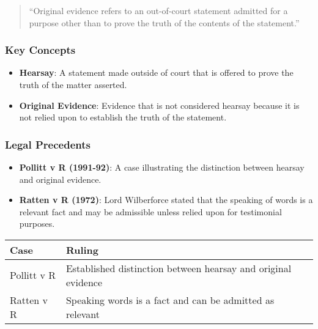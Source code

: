 \begin{quote}
``Original evidence refers to an out-of-court statement admitted for a
purpose other than to prove the truth of the contents of the
statement.''
\end{quote}

\subsubsection{Key Concepts}\label{key-concepts-2}

\begin{itemize}
\tightlist
\item
  \textbf{Hearsay}: A statement made outside of court that is offered to
  prove the truth of the matter asserted.
\item
  \textbf{Original Evidence}: Evidence that is not considered hearsay
  because it is not relied upon to establish the truth of the statement.
\end{itemize}

\subsubsection{Legal Precedents}\label{legal-precedents-1}

\begin{itemize}
\tightlist
\item
  \textbf{Pollitt v R (1991-92)}: A case illustrating the distinction
  between hearsay and original evidence.
\item
  \textbf{Ratten v R (1972)}: Lord Wilberforce stated that the speaking
  of words is a relevant fact and may be admissible unless relied upon
  for testimonial purposes.
\end{itemize}

\begin{longtable}[]{@{}
  >{\raggedright\arraybackslash}p{}
  >{\raggedright\arraybackslash}p{}@{}}
\toprule\noalign{}
\begin{minipage}[b]{\linewidth}\raggedright
Case
\end{minipage} & \begin{minipage}[b]{\linewidth}\raggedright
Ruling
\end{minipage} \\
\midrule\noalign{}
\endhead
\bottomrule\noalign{}
\endlastfoot
Pollitt v R & Established distinction between hearsay and original
evidence \\
Ratten v R & Speaking words is a fact and can be admitted as relevant \\
\end{longtable}

